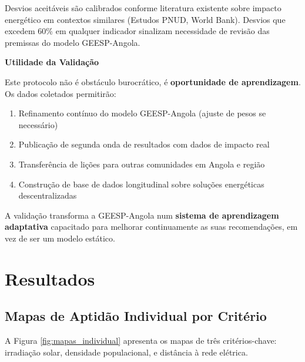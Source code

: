 \documentclass[12pt, a4paper]{article}
\begin{document}
Desvios aceitáveis são calibrados conforme literatura existente sobre impacto energético 
em contextos similares (Estudos PNUD, World Bank). Desvios que excedem 60\% em qualquer 
indicador sinalizam necessidade de revisão das premissas do modelo GEESP-Angola.

\textbf{Utilidade da Validação}

Este protocolo não é obstáculo burocrático, é \textbf{oportunidade de aprendizagem}. 
Os dados coletados permitirão:
\begin{enumerate}
\item Refinamento contínuo do modelo GEESP-Angola (ajuste de pesos se necessário)
\item Publicação de segunda onda de resultados com dados de impacto real
\item Transferência de lições para outras comunidades em Angola e região
\item Construção de base de dados longitudinal sobre soluções energéticas descentralizadas
\end{enumerate}

A validação transforma a GEESP-Angola num \textbf{sistema de aprendizagem adaptativa} 
capacitado para melhorar continuamente as suas recomendações, em vez de ser um modelo 
estático.

\section{Resultados}
\subsection{Mapas de Aptidão Individual por Critério}

A Figura \ref{fig:mapas_individual} apresenta os mapas de três critérios-chave: irradiação solar, densidade populacional, e distância à rede elétrica.
\end{document}
